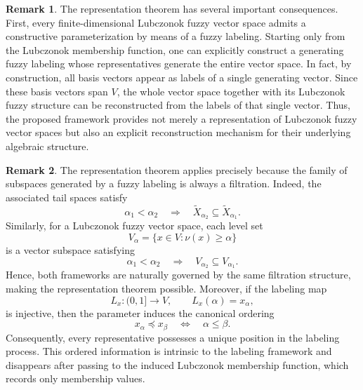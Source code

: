 \documentclass[preprint,12pt]{elsarticle}
\theoremstyle{definition}
\newtheorem{remark}{Remark}[section]
\begin{document}
\begin{remark} 	The representation theorem has several important consequences. First, 	every finite-dimensional Lubczonok fuzzy vector space admits a 	constructive parameterization by means of a fuzzy labeling. Starting only 	from the Lubczonok membership function, one can explicitly construct a 	generating fuzzy labeling whose representatives generate the entire 	vector space. In fact, by construction, all basis vectors appear as 	labels of a single generating vector. Since these basis vectors span 	\(V\), the whole vector space together with its Lubczonok fuzzy 	structure can be reconstructed from the labels of that single vector. 	Thus, the proposed framework provides not merely a representation of 	Lubczonok fuzzy vector spaces but also an explicit reconstruction 	mechanism for their underlying algebraic structure. \end{remark}
 \begin{remark} 	The representation theorem applies precisely because the family of 	subspaces generated by a fuzzy labeling is always a filtration. Indeed, 	the associated tail spaces satisfy 	\[ 	\alpha_1<\alpha_2 	\quad\Longrightarrow\quad 	\widetilde{X}_{\alpha_2}\subseteq 	\widetilde{X}_{\alpha_1}. 	\] 	Similarly, for a Lubczonok fuzzy vector space, each level set 	\[ 	V_\alpha=\{x\in V:\nu(x)\ge\alpha\} 	\] 	is a vector subspace satisfying 	\[ 	\alpha_1<\alpha_2 	\quad\Longrightarrow\quad 	V_{\alpha_2}\subseteq V_{\alpha_1}. 	\] 	Hence, both frameworks are naturally governed by the same filtration 	structure, making the representation theorem possible. 	Moreover, if the labeling map 	\[ 	L_x:(0,1]\longrightarrow V, 	\qquad 	L_x(\alpha)=x_\alpha, 	\] 	is injective, then the parameter induces the canonical ordering 	\[ 	x_\alpha\preceq x_\beta 	\quad\Longleftrightarrow\quad 	\alpha\le\beta. 	\] 	Consequently, every representative possesses a unique position in the 	labeling process. This ordered information is intrinsic to the labeling 	framework and disappears after passing to the induced Lubczonok 	membership function, which records only membership values.
  \end{remark}
\end{document}
